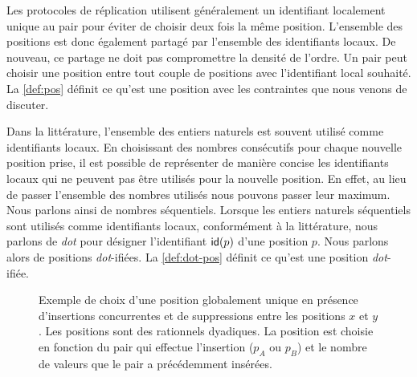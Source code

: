Les protocoles de réplication utilisent généralement un identifiant localement unique au pair pour éviter de choisir deux fois la même position.
L'ensemble des positions est donc également partagé par l'ensemble des identifiants locaux.
De nouveau, ce partage ne doit pas compromettre la densité de l'ordre.
Un pair peut choisir une position entre tout couple de positions avec l'identifiant local souhaité.
La \autoref{def:pos} définit ce qu'est une position avec les contraintes que nous venons de discuter.

Dans la littérature, l'ensemble des entiers naturels est souvent utilisé comme identifiants locaux.
En choisissant des nombres consécutifs pour chaque nouvelle position prise, il est possible de représenter de manière concise les identifiants locaux qui ne peuvent pas être utilisés pour la nouvelle position.
En effet, au lieu de passer l'ensemble des nombres utilisés nous pouvons passer leur maximum.
Nous parlons ainsi de nombres séquentiels.
Lorsque les entiers naturels séquentiels sont utilisés comme identifiants locaux, conformément à la littérature, nous parlons de \emph{dot} pour désigner l'identifiant $\operatorname{\mathsf{id}}(p)$ d'une position $p$.
Nous parlons alors de positions \emph{dot}-ifiées.
La \autoref{def:dot-pos} définit ce qu'est une position \emph{dot}-ifiée.

\begin{figure}[ht]
\centering
{}
\caption[Exemple de choix d'une position globalement unique]{Exemple de choix d'une position globalement unique en présence d'insertions concurrentes et de suppressions entre les positions $x$ et $y$.
Les positions sont des rationnels dyadiques.
La position est choisie en fonction du pair qui effectue l'insertion ($p_A$ ou $p_B$) et le nombre de valeurs que le pair a précédemment insérées.}\label{fig:dyadic-pos}
\end{figure}

